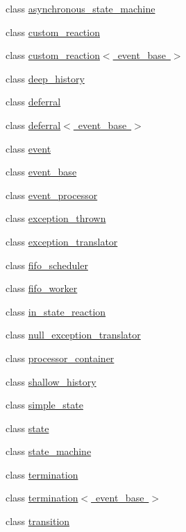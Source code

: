 \begin{DoxyCompactItemize}
\item 
class \mbox{\hyperlink{classboost_1_1statechart_1_1asynchronous__state__machine}{asynchronous\+\_\+state\+\_\+machine}}
\item 
class \mbox{\hyperlink{classboost_1_1statechart_1_1custom__reaction}{custom\+\_\+reaction}}
\item 
class \mbox{\hyperlink{classboost_1_1statechart_1_1custom__reaction_3_01event__base_01_4}{custom\+\_\+reaction$<$ event\+\_\+base $>$}}
\item 
class \mbox{\hyperlink{classboost_1_1statechart_1_1deep__history}{deep\+\_\+history}}
\item 
class \mbox{\hyperlink{classboost_1_1statechart_1_1deferral}{deferral}}
\item 
class \mbox{\hyperlink{classboost_1_1statechart_1_1deferral_3_01event__base_01_4}{deferral$<$ event\+\_\+base $>$}}
\item 
class \mbox{\hyperlink{classboost_1_1statechart_1_1event}{event}}
\item 
class \mbox{\hyperlink{classboost_1_1statechart_1_1event__base}{event\+\_\+base}}
\item 
class \mbox{\hyperlink{classboost_1_1statechart_1_1event__processor}{event\+\_\+processor}}
\item 
class \mbox{\hyperlink{classboost_1_1statechart_1_1exception__thrown}{exception\+\_\+thrown}}
\item 
class \mbox{\hyperlink{classboost_1_1statechart_1_1exception__translator}{exception\+\_\+translator}}
\item 
class \mbox{\hyperlink{classboost_1_1statechart_1_1fifo__scheduler}{fifo\+\_\+scheduler}}
\item 
class \mbox{\hyperlink{classboost_1_1statechart_1_1fifo__worker}{fifo\+\_\+worker}}
\item 
class \mbox{\hyperlink{classboost_1_1statechart_1_1in__state__reaction}{in\+\_\+state\+\_\+reaction}}
\item 
class \mbox{\hyperlink{classboost_1_1statechart_1_1null__exception__translator}{null\+\_\+exception\+\_\+translator}}
\item 
class \mbox{\hyperlink{classboost_1_1statechart_1_1processor__container}{processor\+\_\+container}}
\item 
class \mbox{\hyperlink{classboost_1_1statechart_1_1shallow__history}{shallow\+\_\+history}}
\item 
class \mbox{\hyperlink{classboost_1_1statechart_1_1simple__state}{simple\+\_\+state}}
\item 
class \mbox{\hyperlink{classboost_1_1statechart_1_1state}{state}}
\item 
class \mbox{\hyperlink{classboost_1_1statechart_1_1state__machine}{state\+\_\+machine}}
\item 
class \mbox{\hyperlink{classboost_1_1statechart_1_1termination}{termination}}
\item 
class \mbox{\hyperlink{classboost_1_1statechart_1_1termination_3_01event__base_01_4}{termination$<$ event\+\_\+base $>$}}
\item 
class \mbox{\hyperlink{classboost_1_1statechart_1_1transition}{transition}}
\end{DoxyCompactItemize}
